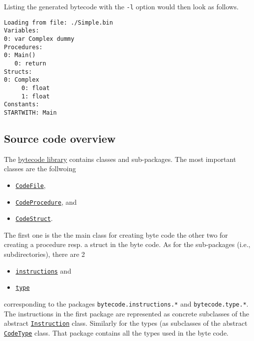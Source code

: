 \documentclass[11pt]{article}
\begin{document}
Listing the generated bytecode with the \texttt{-l} option would then look as
follows.

\begin{verbatim}
Loading from file: ./Simple.bin
Variables:
0: var Complex dummy
Procedures:
0: Main()
   0: return
Structs:
0: Complex
     0: float
     1: float
Constants:
STARTWITH: Main
\end{verbatim}



\subsection{Source code overview}
\label{sec:org06cf4b0}

The \href{../../../material/oblig2-patch/src/bytecode/}{bytecode library} contains classes and sub-packages. The most important
classes are the follwoing

\begin{itemize}
\item \href{../../../material/oblig2-patch/src/bytecode/CodeFile.java}{\texttt{CodeFile}},
\item \href{../../../material/oblig2-patch/src/bytecode/CodeProcedure.java}{\texttt{CodeProcedure}}, and
\item \href{../../../material/oblig2-patch/src/bytecode/CodeStruct.java}{\texttt{CodeStruct}}.
\end{itemize}

The first one is the the main class for creating byte code the other two
for creating a procedure resp. a struct in the byte code. As for the
sub-packages (i.e., subdirectories), there are 2

\begin{itemize}
\item \href{../../../material/oblig2-patch/src/bytecode/./instructions/}{\texttt{instructions}} and
\item \href{../../../material/oblig2-patch/src/bytecode/type/}{\texttt{type}}
\end{itemize}

corresponding to the packages \texttt{bytecode.instructions.*} and
\texttt{bytecode.type.*}.  The instructions in the first package are represented
as concrete subclasses of the abstract \href{../../../material/oblig2-patch/src/bytecode/./instructions/Instruction.java}{\texttt{Instruction}} class.  Similarly for
the types (as subclasses of the abstract \href{../../../material/oblig2-patch/src/bytecode/./type/CodeType.java}{\texttt{CodeType}} class. That package
contains all the types used in the byte code.
\end{document}
